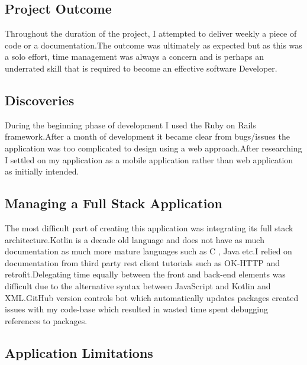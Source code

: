      

\subsection{Project Outcome}
Throughout the duration of the project, I attempted to deliver weekly a piece of code or a documentation.The outcome was ultimately as expected but as this was a solo effort,  time management  was always a concern and is perhaps an underrated skill that is required  to become an effective software Developer.

\subsection{Discoveries}

During the beginning phase of development I used the Ruby on Rails framework.After a month of development it became clear from bugs/issues the application was too complicated to design using a web approach.After researching I settled on my application as a  mobile application   rather than  web application as initially intended.


\subsection{Managing a Full Stack Application }
The most difficult part of creating this application was integrating  its full stack architecture.Kotlin is a decade old language and does not have as much documentation as much more mature languages such as C , Java etc.I relied on documentation from third party rest client tutorials such as OK-HTTP and retrofit.Delegating time equally between the front and back-end elements was difficult due to the alternative syntax between JavaScript and Kotlin and XML.GitHub version controls bot which automatically updates packages created issues with my code-base which resulted in wasted time spent debugging references to packages.


\subsection{Application Limitations}


